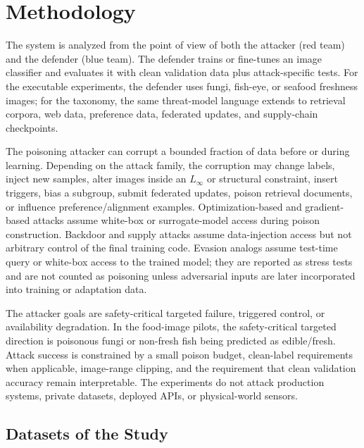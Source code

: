 \documentclass[conference]{IEEEtran}
\begin{document}
\section{Methodology}

The system is analyzed from the point of view of both the attacker (red team) and the defender (blue team). The defender trains or fine-tunes an image classifier and evaluates it with clean validation data plus attack-specific tests. For the executable experiments, the defender uses fungi, fish-eye, or seafood freshness images; for the taxonomy, the same threat-model language extends to retrieval corpora, web data, preference data, federated updates, and supply-chain checkpoints.

The poisoning attacker can corrupt a bounded fraction of data before or during learning. Depending on the attack family, the corruption may change labels, inject new samples, alter images inside an \(L_\infty\) or structural constraint, insert triggers, bias a subgroup, submit federated updates, poison retrieval documents, or influence preference/alignment examples. Optimization-based and gradient-based attacks assume white-box or surrogate-model access during poison construction. Backdoor and supply attacks assume data-injection access but not arbitrary control of the final training code. Evasion analogs assume test-time query or white-box access to the trained model; they are reported as stress tests and are not counted as poisoning unless adversarial inputs are later incorporated into training or adaptation data.

The attacker goals are safety-critical targeted failure, triggered control, or availability degradation. In the food-image pilots, the safety-critical targeted direction is poisonous fungi or non-fresh fish being predicted as edible/fresh. Attack success is constrained by a small poison budget, clean-label requirements when applicable, image-range clipping, and the requirement that clean validation accuracy remain interpretable. The experiments do not attack production systems, private datasets, deployed APIs, or physical-world sensors.


\subsection{Datasets of the Study}
\end{document}
